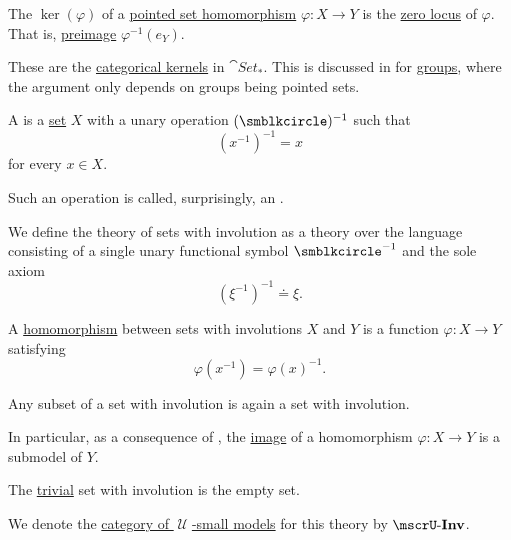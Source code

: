 \begin{definition}\label{def:pointed_set_kernel}\mimprovised
  The  \( \ker(\varphi) \) of a \hyperref[def:pointed_set/homomorphism]{pointed set homomorphism} \( \varphi: X \to Y \) is the \hyperref[def:zero_locus]{zero locus} of \( \varphi \). That is, \hyperref[thm:def:function/properties/preimage]{preimage} \( \varphi^{-1}(e_Y) \).

  These are the \hyperref[def:zero_morphisms/kernel]{categorical kernels} in \hyperref[def:pointed_set/category]{\( \cat{Set_*} \)}. This is discussed in  for \hyperref[def:group]{groups}, where the argument only depends on groups being pointed sets.
\end{definition}

\begin{definition}\label{def:set_with_involution}\mimprovised
  A  is a \hyperref[def:set]{set} \( X \) with a unary operation \( (\anon)^{-1} \) such that
  \begin{equation*}
    (x^{-1})^{-1} = x
  \end{equation*}
  for every \( x \in X \).

  Such an operation is called, surprisingly, an .

  \begin{thmenum}
     We define the theory of sets with involution as a theory over the language consisting of a single unary functional symbol \( \anon^{-1} \) and the sole axiom
    \begin{equation}\label{eq:def:set_with_involution/theory/axiom}
      (\xi^{-1})^{-1} \doteq \xi.
    \end{equation}

     A \hyperref[def:first_order_homomorphism]{homomorphism} between sets with involutions \( X \) and \( Y \) is a function \( \varphi: X \to Y \) satisfying
    \begin{equation}\label{eq:def:set_with_involution/homomorphism}
      \varphi(x^{-1})
      =
      \varphi(x)^{-1}.
    \end{equation}

     Any subset of a set with involution is again a set with involution.

    In particular, as a consequence of , the \hyperref[def:multi_valued_function/image]{image} of a homomorphism \( \varphi: X \to Y \) is a submodel of \( Y \).

     The \hyperref[thm:substructures_form_complete_lattice/bottom]{trivial} set with involution is the empty set.

     We denote the \hyperref[def:category_of_small_first_order_models]{category of \( \mscrU \)-small models} for this theory by \( \ucat{Inv} \).
  \end{thmenum}
\end{definition}

